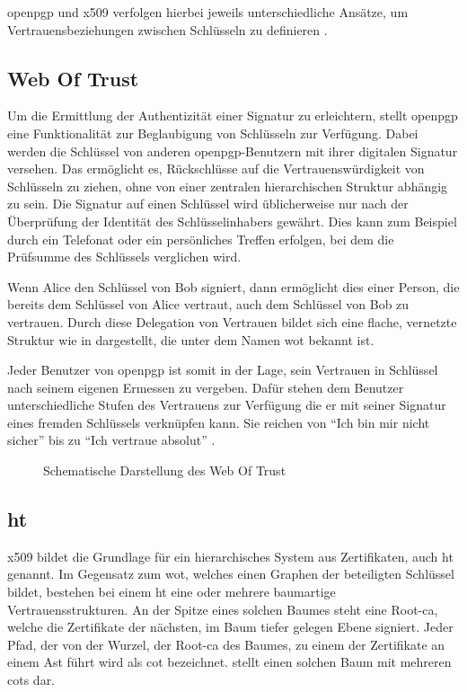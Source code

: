 \gls{openpgp} und \gls{x509} verfolgen hierbei jeweils unterschiedliche Ansätze, um Vertrauensbeziehungen zwischen Schlüsseln zu definieren
\cite{krypto-pki-internet}.

\subsection{Web Of Trust}
\label{sec:GrundlagenDefinitionen:Vertrauen:WOT}
Um die Ermittlung der Authentizität einer Signatur zu erleichtern, stellt \gls{openpgp} eine Funktionalität zur Beglaubigung von Schlüsseln zur Verfügung. Dabei
werden die Schlüssel von anderen \gls{openpgp}-Benutzern mit ihrer digitalen Signatur versehen. Das ermöglicht es, Rückschlüsse auf die Vertrauenswürdigkeit
von Schlüsseln zu ziehen, ohne von einer zentralen hierarchischen Struktur abhängig zu sein. Die Signatur auf einen Schlüssel wird üblicherweise nur nach der
Überprüfung der Identität des Schlüsselinhabers gewährt. Dies kann zum Beispiel durch ein Telefonat oder ein persönliches Treffen erfolgen, bei dem die
Prüfsumme des Schlüssels verglichen wird.  

Wenn Alice den Schlüssel von Bob signiert, dann ermöglicht dies einer Person, die bereits dem Schlüssel von Alice vertraut, auch dem Schlüssel von Bob zu
vertrauen. Durch diese Delegation von Vertrauen bildet sich eine flache, vernetzte Struktur wie in  dargestellt, die unter dem Namen \gls{wot}
bekannt ist. 

Jeder Benutzer von \gls{openpgp} ist somit in der Lage, sein Vertrauen in Schlüssel nach seinem eigenen Ermessen zu vergeben. Dafür stehen dem
Benutzer unterschiedliche Stufen des Vertrauens zur Verfügung die er mit seiner Signatur eines fremden Schlüssels verknüpfen kann. Sie reichen von "`Ich bin mir
nicht sicher"' bis zu "`Ich vertraue absolut"' \cite{pgp}.

\begin{figure}
\centering

\caption{Schematische Darstellung des Web Of Trust}
\label{fig:wot}
\end{figure}

\subsection{\protect\glsdesc*{ht}}
\label{sec:GrundlagenDefinitionen:Vertrauen:HT}
\gls{x509} bildet die Grundlage für ein hierarchisches System aus Zertifikaten, auch \gls{ht} genannt. Im Gegensatz zum \gls{wot}, welches einen Graphen der
beteiligten Schlüssel bildet, bestehen bei einem \gls{ht} eine oder mehrere baumartige Vertrauensstrukturen.
An der Spitze eines solchen Baumes steht eine Root-\gls{ca}, welche die Zertifikate der nächsten, im Baum tiefer gelegen Ebene signiert. Jeder Pfad, der von der
Wurzel, der Root-\gls{ca} des Baumes, zu einem der Zertifikate an einem Ast führt wird als \gls{cot} bezeichnet.  stellt einen solchen Baum mit
mehreren \glspl{cot} dar.

